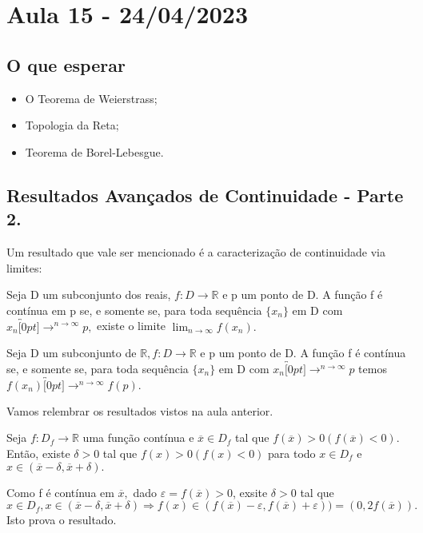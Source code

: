 \documentclass[analysis_notes.tex]{subfiles}
\begin{document}
\section{Aula 15 - 24/04/2023}
\subsection{O que esperar}
\begin{itemize}
	\item O Teorema de Weierstrass;
	\item Topologia da Reta;
	\item Teorema de Borel-Lebesgue.
\end{itemize}
\subsection{Resultados Avan\c cados de Continuidade - Parte 2.}
Um resultado que vale ser mencionado \'e a caracteriza\c c\~ao de continuidade via limites:
\begin{theorem*}
	Seja D um subconjunto dos reais, $f:D\rightarrow \mathbb{R}$ e p um ponto de D. A fun\c c\~ao f \'e cont\'inua em p se, e somente
	se, para toda sequ\^encia $\{x_{n}\}$ em D com $x_{n}\overbracket[0pt]{\longrightarrow}^{n\to \infty}p,$ existe o limite $\lim_{n\to \infty}f(x_{n}).$
\end{theorem*}
\begin{crl*}
	Seja D um subconjunto de $\mathbb{R}, f:D\rightarrow \mathbb{R} $ e p um ponto de D. A fun\c c\~ao f \'e cont\'inua se, e somente
	se, para toda sequ\^encia $\{x_{n}\}$ em D com $x_{n}\overbracket[0pt]{\longrightarrow}^{n\to \infty}p$ temos $f(x_{n})\overbracket[0pt]{\longrightarrow}^{n\to \infty}f(p).$
\end{crl*}
Vamos relembrar os resultados vistos na aula anterior.
\begin{theorem*}
	Seja $f:D_{f}\rightarrow \mathbb{R}$ uma fun\c c\~ao cont\'inua e $\overline{x}\in D_{f}$ tal que $f(\overline{x})>0(f(\overline{x})<0).$
	Ent\~ao, existe $\delta>0$ tal que $f(x)>0(f(x)<0)$ para todo $x\in D_{f}$ e $x\in(\overline{x}-\delta, \overline{x}+\delta).$
\end{theorem*}
\begin{proof*}
	Como f \'e cont\'inua em $\overline{x},$ dado $\varepsilon = f(\overline{x}) >0$, exsite $\delta > 0$ tal que
	$$
		x\in D_{f}, x\in(\overline{x}-\delta, \overline{x}+\delta) \Rightarrow f(x)\in (f(\overline{x})-\varepsilon, f(\overline{x})+\varepsilon)) =
		(0, 2f(\overline{x})).
	$$
	Isto prova o resultado. \qedsymbol
\end{proof*}
\end{document}
